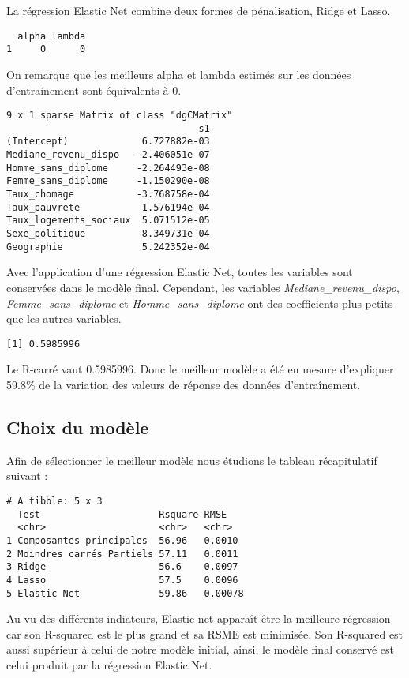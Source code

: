 \documentclass[
]{article}
\begin{document}
La régression Elastic Net combine deux formes de pénalisation, Ridge et
Lasso.

\begin{verbatim}
  alpha lambda
1     0      0
\end{verbatim}

On remarque que les meilleurs alpha et lambda estimés sur les données
d'entrainement sont équivalents à 0.

\begin{verbatim}
9 x 1 sparse Matrix of class "dgCMatrix"
                                  s1
(Intercept)             6.727882e-03
Mediane_revenu_dispo   -2.406051e-07
Homme_sans_diplome     -2.264493e-08
Femme_sans_diplome     -1.150290e-08
Taux_chomage           -3.768758e-04
Taux_pauvrete           1.576194e-04
Taux_logements_sociaux  5.071512e-05
Sexe_politique          8.349731e-04
Geographie              5.242352e-04
\end{verbatim}

Avec l'application d'une régression Elastic Net, toutes les variables
sont conservées dans le modèle final. Cependant, les variables
\emph{Mediane\_revenu\_dispo}, \emph{Femme\_sans\_diplome} et
\emph{Homme\_sans\_diplome} ont des coefficients plus petits que les
autres variables.

\begin{verbatim}
[1] 0.5985996
\end{verbatim}

Le R-carré vaut 0.5985996. Donc le meilleur modèle a été en mesure
d'expliquer 59.8\% de la variation des valeurs de réponse des données
d'entraînement.

\hypertarget{choix-du-moduxe8le}{%
\subsection{Choix du modèle}\label{choix-du-moduxe8le}}

Afin de sélectionner le meilleur modèle nous étudions le tableau
récapitulatif suivant :

\begin{verbatim}
# A tibble: 5 x 3
  Test                     Rsquare RMSE   
  <chr>                    <chr>   <chr>  
1 Composantes principales  56.96   0.0010 
2 Moindres carrés Partiels 57.11   0.0011 
3 Ridge                    56.6    0.0097 
4 Lasso                    57.5    0.0096 
5 Elastic Net              59.86   0.00078
\end{verbatim}

Au vu des différents indiateurs, Elastic net apparaît être la meilleure
régression car son R-squared est le plus grand et sa RSME est minimisée.
Son R-squared est aussi supérieur à celui de notre modèle initial,
ainsi, le modèle final conservé est celui produit par la régression
Elastic Net.
\end{document}
